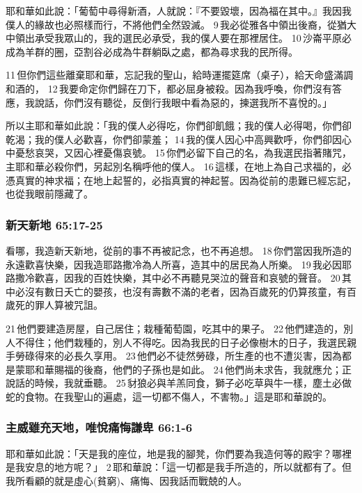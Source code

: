 耶和華如此說：「葡萄中尋得新酒，人就說：『不要毀壞，因為福在其中。』我因我僕人的緣故也必照樣而行，不將他們全然毀滅。 9 我必從雅各中領出後裔，從猶大中領出承受我眾山的，我的選民必承受，我的僕人要在那裡居住。 10 沙崙平原必成為羊群的圈，亞割谷必成為牛群躺臥之處，都為尋求我的民所得。 


11 但你們這些離棄耶和華，忘記我的聖山，給時運擺筵席（桌子），給天命盛滿調和酒的， 12 我要命定你們歸在刀下，都必屈身被殺。因為我呼喚，你們沒有答應，我說話，你們沒有聽從，反倒行我眼中看為惡的，揀選我所不喜悅的。」

所以主耶和華如此說：「我的僕人必得吃，你們卻飢餓；我的僕人必得喝，你們卻乾渴；我的僕人必歡喜，你們卻蒙羞； 14 我的僕人因心中高興歡呼，你們卻因心中憂愁哀哭，又因心裡憂傷哀號。 15 你們必留下自己的名，為我選民指著賭咒，主耶和華必殺你們，另起別名稱呼他的僕人。 16 這樣，在地上為自己求福的，必憑真實的神求福；在地上起誓的，必指真實的神起誓。因為從前的患難已經忘記，也從我眼前隱藏了。

\subsubsection{新天新地 65:17-25}
看哪，我造新天新地，從前的事不再被記念，也不再追想。 18 你們當因我所造的永遠歡喜快樂，因我造耶路撒冷為人所喜，造其中的居民為人所樂。 19 我必因耶路撒冷歡喜，因我的百姓快樂，其中必不再聽見哭泣的聲音和哀號的聲音。 20 其中必沒有數日夭亡的嬰孩，也沒有壽數不滿的老者，因為百歲死的仍算孩童，有百歲死的罪人算被咒詛。 

21 他們要建造房屋，自己居住；栽種葡萄園，吃其中的果子。 22 他們建造的，別人不得住；他們栽種的，別人不得吃。因為我民的日子必像樹木的日子，我選民親手勞碌得來的必長久享用。 23 他們必不徒然勞碌，所生產的也不遭災害，因為都是蒙耶和華賜福的後裔，他們的子孫也是如此。 24 他們尚未求告，我就應允；正說話的時候，我就垂聽。 25 豺狼必與羊羔同食，獅子必吃草與牛一樣，塵土必做蛇的食物。在我聖山的遍處，這一切都不傷人，不害物。」這是耶和華說的。


\subsubsection{主威雖充天地，唯悅痛悔謙卑 66:1-6}
耶和華如此說：「天是我的座位，地是我的腳凳，你們要為我造何等的殿宇？哪裡是我安息的地方呢？」 2 耶和華說：「這一切都是我手所造的，所以就都有了。但我所看顧的就是虛心(貧窮)、痛悔、因我話而戰兢的人。 


